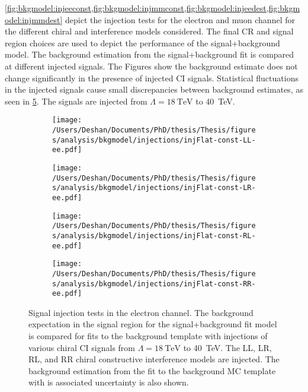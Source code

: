 \cref{fig:bkgmodel:injeeconst,fig:bkgmodel:injmmconst,fig:bkgmodel:injeedest,fig:bkgmodel:injmmdest} depict the injection tests for the electron and muon channel for the different chiral and interference models considered. The final CR and signal region choices are used to depict the performance of the signal+background model. The background estimation from the signal+background fit is compared at different injected signals. The Figures show the background estimate does not change significantly in the presence of injected CI signals. Statistical fluctuations in the injected signals cause small discrepancies between background estimates, as seen in \cref{fig:bkgmodel:injeeconst}. The signals are injected from $\Lambda = \SI{18}{\tera\electronvolt}$ to \SI{40}{\tera\electronvolt}. 

\begin{figure}[h!]
    \centering
    \begin{subfigure}[b]{0.49\textwidth}
        \centering
        \texttt{[image: /Users/Deshan/Documents/PhD/thesis/Thesis/figures/analysis/bkgmodel/injections/injFlat-const-LL-ee.pdf]}
        \label{fig:bkgmodel:injee1}
    \end{subfigure}
    \begin{subfigure}[b]{0.49\textwidth}
        \centering
        \texttt{[image: /Users/Deshan/Documents/PhD/thesis/Thesis/figures/analysis/bkgmodel/injections/injFlat-const-LR-ee.pdf]}
        \label{fig:bkgmodel:injee3}
    \end{subfigure}
    \begin{subfigure}[b]{0.49\textwidth}
        \centering
        \texttt{[image: /Users/Deshan/Documents/PhD/thesis/Thesis/figures/analysis/bkgmodel/injections/injFlat-const-RL-ee.pdf]}
        \label{fig:bkgmodel:injee5}
    \end{subfigure}
    \begin{subfigure}[b]{0.49\textwidth}
        \centering
        \texttt{[image: /Users/Deshan/Documents/PhD/thesis/Thesis/figures/analysis/bkgmodel/injections/injFlat-const-RR-ee.pdf]}
        \label{fig:bkgmodel:injee7}
    \end{subfigure}
    \caption[Signal injection tests in the electron channel for constructive interference models]{Signal injection tests in the electron channel. The background expectation in the signal region for the signal+background fit model is compared for fits to the background template with injections of various chiral CI signals from $\Lambda = \SI{18}{\tera\electronvolt}$ to \SI{40}{\tera\electronvolt}. The LL, LR, RL, and RR chiral constructive interference models are injected. The background estimation from the fit to the background MC template with is associated uncertainty is also shown.}
    \label{fig:bkgmodel:injeeconst}
\end{figure}

